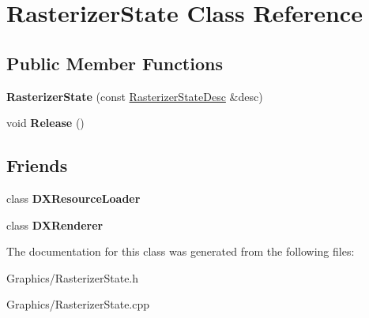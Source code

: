 \hypertarget{classRasterizerState}{}\section{Rasterizer\+State Class Reference}
\label{classRasterizerState}
\subsection*{Public Member Functions}
\begin{DoxyCompactItemize}
\item 
\mbox{\label{classRasterizerState_ac526d3750a2267b5370ccb9d19e5cfa1}} 
{\bfseries Rasterizer\+State} (const \hyperlink{structRasterizerStateDesc}{Rasterizer\+State\+Desc} \&desc)
\item 
\mbox{\label{classRasterizerState_a3c5ec317af2353b3931b846a4ccd2c69}} 
void {\bfseries Release} ()
\end{DoxyCompactItemize}
\subsection*{Friends}
\begin{DoxyCompactItemize}
\item 
\mbox{\label{classRasterizerState_a871268c492209c5a9db9dc2db99f4d04}} 
class {\bfseries D\+X\+Resource\+Loader}
\item 
\mbox{\label{classRasterizerState_a14ab6f966322dccbf6597d0c82bf48c6}} 
class {\bfseries D\+X\+Renderer}
\end{DoxyCompactItemize}


The documentation for this class was generated from the following files\+:\begin{DoxyCompactItemize}
\item 
Graphics/Rasterizer\+State.\+h\item 
Graphics/Rasterizer\+State.\+cpp\end{DoxyCompactItemize}
